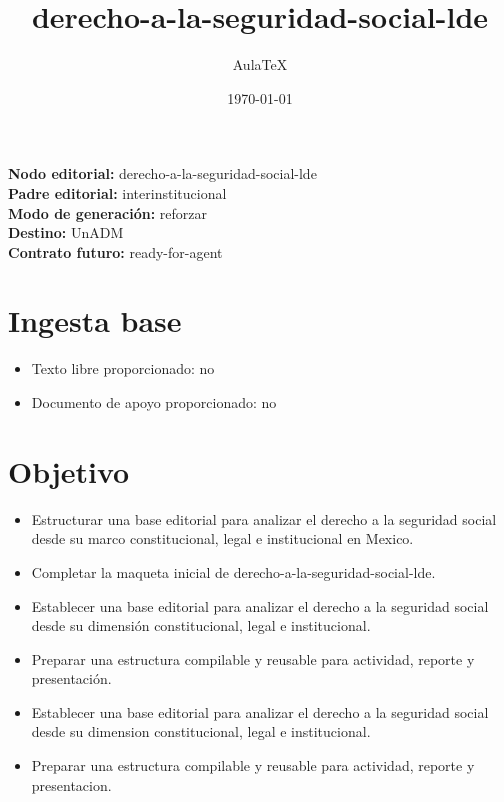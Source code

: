 \documentclass[12pt]{article}
\title{derecho-a-la-seguridad-social-lde}
\author{AulaTeX}
\date{\today}
\begin{document}
\maketitle

\noindent\textbf{Nodo editorial:} derecho-a-la-seguridad-social-lde\\
\textbf{Padre editorial:} interinstitucional\\
\textbf{Modo de generación:} reforzar\\
\textbf{Destino:} UnADM\\
\textbf{Contrato futuro:} ready-for-agent

\section*{Ingesta base}
\begin{itemize}[leftmargin=*]
  \item Texto libre proporcionado: no
  \item Documento de apoyo proporcionado: no
\end{itemize}

\section*{Objetivo}
\begin{itemize}[leftmargin=*]
  \item Estructurar una base editorial para analizar el derecho a la seguridad social desde su marco constitucional, legal e institucional en Mexico.
  \item Completar la maqueta inicial de derecho-a-la-seguridad-social-lde.
  \item Establecer una base editorial para analizar el derecho a la seguridad social desde su dimensión constitucional, legal e institucional.
  \item Preparar una estructura compilable y reusable para actividad, reporte y presentación.
  \item Establecer una base editorial para analizar el derecho a la seguridad social desde su dimension constitucional, legal e institucional.
  \item Preparar una estructura compilable y reusable para actividad, reporte y presentacion.
\end{itemize}
\end{document}

